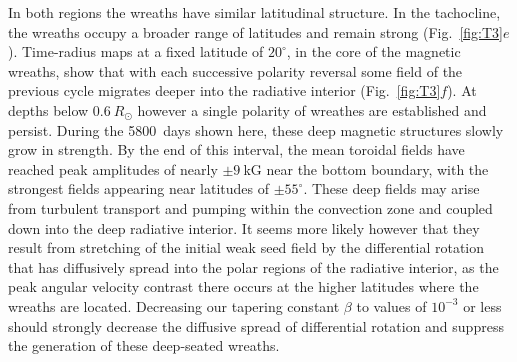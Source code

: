 In both regions the wreaths have similar latitudinal structure.
In the tachocline, the wreaths occupy a broader range of latitudes and
remain strong  (Fig.~\ref{fig:T3}$e$).  Time-radius maps at a fixed latitude of $20^\circ$, in
the core of the magnetic wreaths, show that with each successive
polarity reversal some field of the previous cycle migrates deeper
into the radiative interior (Fig.~\ref{fig:T3}$f$).  At depths below $0.6\: R_\odot$ however
a single polarity of wreathes are established and persist.  During the
5800~days shown here, these deep magnetic structures slowly grow in
strength.  By the end of this interval, the mean toroidal fields have reached
peak amplitudes of nearly $\pm 9\:$kG near the bottom boundary, with
the strongest fields appearing near latitudes of $\pm55^\circ$.  These deep
fields may  arise from turbulent transport and pumping within the
convection zone and coupled down into the deep radiative interior.
It seems more likely however that they result from stretching of the initial
weak seed field by the differential rotation that has diffusively spread into
the polar regions of the radiative interior, as the peak angular
velocity contrast there occurs at the higher latitudes where the
wreaths are located.  Decreasing our tapering constant
$\beta$ to values of $10^{-3}$ or less should strongly decrease the
diffusive spread of differential rotation and suppress the generation
of these deep-seated wreaths.








